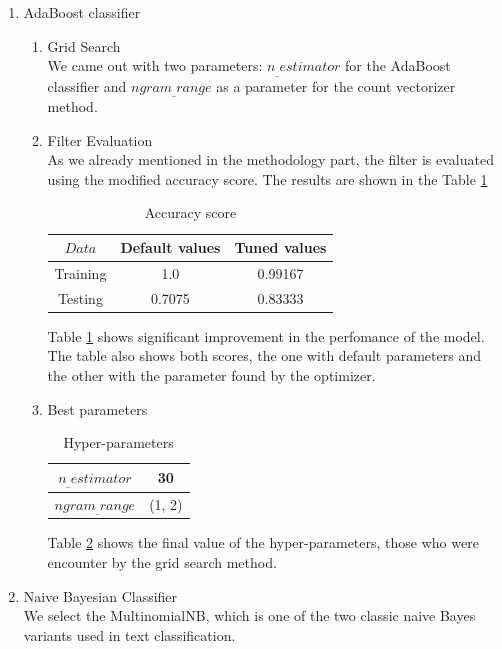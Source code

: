 \documentclass[journal]{IEEEtran}
\begin{document}
\begin{enumerate}
\begin{enumerate}
\end{enumerate}


\item AdaBoost classifier


\begin{enumerate}
\item Grid Search\\
We came out with two parameters: $n_{\_}estimator$ for the AdaBoost classifier and $ngram_{\_}range$ as a parameter for the count vectorizer method.
 
\item Filter Evaluation\\
As we already mentioned in the methodology part, the filter is evaluated using the modified accuracy score. The results are shown in the Table \ref{temp0}

\begin{table}[ht]
\renewcommand{\arraystretch}{1.3}
\centering
\begin{tabular}{|c|c|c|}
\hline
$ Data$ & Default values & Tuned values\\
\hline
Training & 1.0 & 0.99167\\
\hline
Testing & 0.7075 & 0.83333\\
\hline
\end{tabular}
\caption{Accuracy score}
\label{temp0}
\end{table}
Table \ref{temp0} shows significant improvement in the perfomance of the model. The table also shows both scores, the one with default parameters and the other with the parameter found by the optimizer.

\item Best parameters

\begin{table}[ht]
\renewcommand{\arraystretch}{1.3}
\centering
\begin{tabular}{|c|c|}
\hline
$n_{\_}estimator$ & 30\\
\hline
$ngram_{\_}range$ & (1, 2) \\
\hline
\end{tabular}
\caption{Hyper-parameters}
\label{temp3}
\end{table}
Table \ref{temp3} shows the final value of the hyper-parameters, those who were encounter by the grid search method.
\end{enumerate}



\item Naive Bayesian Classifier\\
We select the MultinomialNB, which is one of the two classic naive Bayes variants used in text classification.


\end{enumerate}
\end{document}
